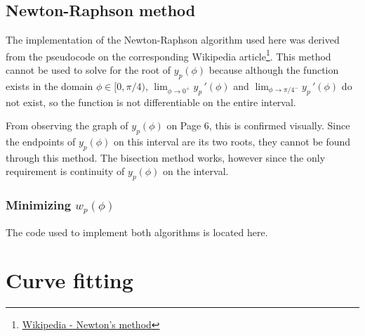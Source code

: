 \subsection{Newton-Raphson method}

The implementation of the Newton-Raphson algorithm used here was derived from the pseudocode on the
corresponding Wikipedia article\footnote{\href{https://en.wikipedia.org/wiki/Newtons_method}{Wikipedia - Newton's method}}.
This method cannot be used to solve for the root of $y_p(\phi)$ because although the function exists in the domain $\phi\in[0,\pi/4)$,
$\lim_{\phi\to 0^+}y_p\,'(\phi)$ and $\lim_{\phi\to \pi/4^-}y_p\,'(\phi)$ do not exist, so the function is not differentiable on the entire interval.

From observing the graph of $y_p(\phi)$ on Page 6, this is confirmed visually. Since the endpoints of $y_p(\phi)$ on this interval are its two roots,
they cannot be found through this method. The bisection method works, however since the only requirement is continuity of $y_p(\phi)$ on the interval.

\subsubsection{Minimizing \texorpdfstring{$w_p(\phi)$}{}}

The code used to implement both algorithms is located here.

\section{Curve fitting}